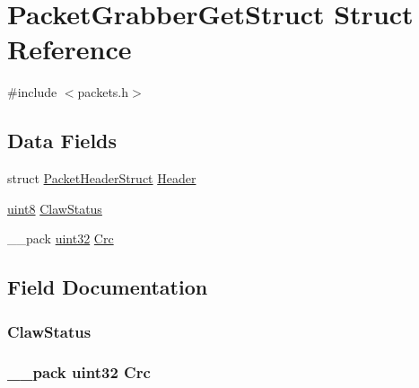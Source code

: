 \hypertarget{struct_packet_grabber_get_struct}{}\section{Packet\+Grabber\+Get\+Struct Struct Reference}
\label{struct_packet_grabber_get_struct}


{\ttfamily \#include $<$packets.\+h$>$}

\subsection*{Data Fields}
\begin{DoxyCompactItemize}
\item 
struct \hyperlink{struct_packet_header_struct}{Packet\+Header\+Struct} \hyperlink{struct_packet_grabber_get_struct_ab201af50281aff5ed4f984f994938007}{Header}
\item 
\hyperlink{_h_y_d_r_a_s_8_x_2types_8h_a33a5e996e7a90acefb8b1c0bea47e365}{uint8} \hyperlink{struct_packet_grabber_get_struct_aa9d30bc76110de037e51c8226b0588e9}{Claw\+Status}
\item 
\+\_\+\+\_\+pack \hyperlink{_h_y_d_r_a_s_8_x_2types_8h_acbd4acd0d29e2d6c43104827f77d9cd2}{uint32} \hyperlink{struct_packet_grabber_get_struct_a9ac0191cb1217dfb4164ca0e333de3ac}{Crc}
\end{DoxyCompactItemize}


\subsection{Field Documentation}
\hypertarget{struct_packet_grabber_get_struct_aa9d30bc76110de037e51c8226b0588e9}{}
\subsubsection[{Claw\+Status}]{ Claw\+Status}\label{struct_packet_grabber_get_struct_aa9d30bc76110de037e51c8226b0588e9}
\hypertarget{struct_packet_grabber_get_struct_a9ac0191cb1217dfb4164ca0e333de3ac}{}
\subsubsection[{Crc}]{\setlength{\rightskip}{0pt plus 5cm}\+\_\+\+\_\+pack {\bf uint32} Crc}\label{struct_packet_grabber_get_struct_a9ac0191cb1217dfb4164ca0e333de3ac}
\hypertarget{struct_packet_grabber_get_struct_ab201af50281aff5ed4f984f994938007}{}
